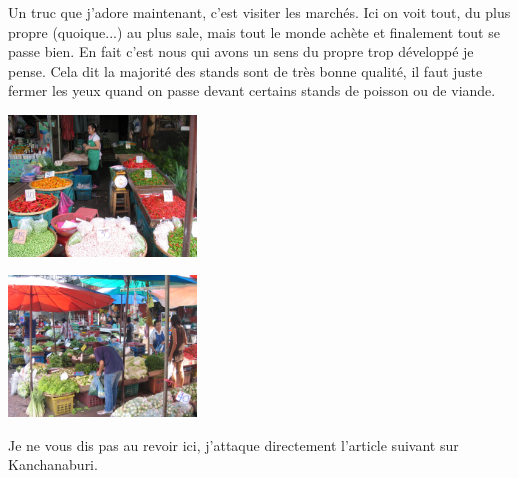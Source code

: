 \begin{multicols}{2}
Un truc que j'adore maintenant, c'est visiter les marchés. Ici on voit tout, du plus propre (quoique...) au plus sale, mais tout le monde achète et finalement tout se passe bien. En fait c'est nous qui avons un sens du propre trop développé je pense. Cela dit la majorité des stands sont de très bonne qualité, il faut juste fermer les yeux quand on passe devant certains stands de poisson ou de viande.

\smallbreak
\hspace*{-0.65cm}
\includegraphics[width=5cm]{articles/Bangkok/1384.jpg}
\smallbreak

\smallbreak
\hspace*{-0.65cm}
\includegraphics[width=5cm]{articles/Bangkok/1387.jpg}
\smallbreak


Je ne vous dis pas au revoir ici, j'attaque directement l'article suivant sur Kanchanaburi.

\end{multicols}


